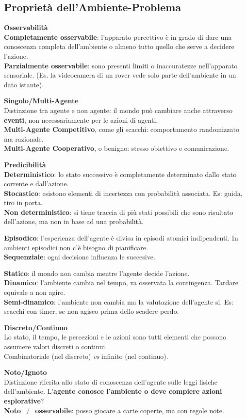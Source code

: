 \documentclass[10pt]{book}
\begin{document}
\subsection{Proprietà dell'Ambiente-Problema}
\begin{list}{-}{}
	\item \textbf{Osservabilità}\\\textbf{Completamente osservabile}: l'apparato percettivo è in grado di dare una conoscenza completa dell'ambiente o almeno tutto quello che serve a decidere l'azione.\\
	\textbf{Parzialmente osservabile}: sono presenti limiti o inaccuratezze nell'apparato sensoriale. (Es. la videocamera di un rover vede solo parte dell'ambiente in un dato istante).
	\item \textbf{Singolo/Multi-Agente}\\
	Distinzione tra agente e non agente: il mondo può cambiare anche attraverso \textbf{eventi}, non necessariamente per le azioni di agenti.\\
	\textbf{Multi-Agente Competitivo}, come gli scacchi: comportamento randomizzato ma razionale.\\
	\textbf{Multi-Agente Cooperativo}, o benigno: stesso obiettivo e comunicazione.
	\item \textbf{Predicibilità}\\
	\textbf{Deterministico}: lo stato successivo è completamente determinato dallo stato corrente e dall'azione.\\
	\textbf{Stocastico}: esistono elementi di incertezza con probabilità associata. Es: guida, tiro in porta.\\
	\textbf{Non deterministico}: si tiene traccia di più stati possibili che sono risultato dell'azione, ma non in base ad una probabilità.
	\item \textbf{Episodico}: l'esperienza dell'agente è divisa in episodi atomici indipendenti. In ambienti episodici non c'è bisogno di pianificare.\\
	\textbf{Sequenziale}: ogni decisione influenza le succesive.
	\item \textbf{Statico}: il mondo non cambia mentre l'agente decide l'azione.\\
	\textbf{Dinamico}: l'ambiente cambia nel tempo, va osservata la contingenza. Tardare equivale a non agire.\\
	\textbf{Semi-dinamico}: l'ambiente non cambia ma la valutazione dell'agente si. Es: scacchi con timer, se non agisco prima dello scadere perdo.
	\item \textbf{Discreto/Continuo}\\
	Lo stato, il tempo, le percezioni e le azioni sono tutti elementi che possono assumere valori discreti o continui.\\
	Combinatoriale (nel discreto) \textit{vs} infinito (nel continuo).
	\item \textbf{Noto/Ignoto}\\
	Distinzione riferita allo stato di conoscenza dell'agente sulle leggi fisiche dell'ambiente. L'\textbf{agente conosce l'ambiente o deve compiere azioni esplorative}?\\
	\textbf{Noto $\neq$ osservabile}: posso giocare a carte coperte, ma con regole note.
\end{list}
\end{document}
